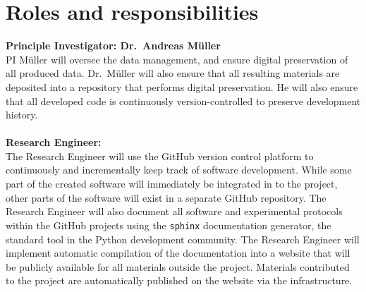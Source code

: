 











%

\section{Roles and responsibilities}

\textbf{Principle Investigator: Dr.\ Andreas M\"uller}\\
PI M\"uller will oversee the data management, and ensure digital preservation of
all produced data. Dr.\ M\"uller will also ensure that all resulting materials
are deposited into a repository that performs digital preservation.
He will also ensure that all developed code is continuously version-controlled to
preserve development history.
\\\\
\textbf{Research Engineer:}\\
The Research Engineer will use the GitHub version control platform to
continuously and incrementally keep track of software development. While some
part of the created software will immediately be integrated in to the
\sklearn{} project, other parts of the software will exist in a separate
GitHub repository. The Research Engineer will also document all software and
experimental protocols within the GitHub projects using the \texttt{sphinx}
documentation generator, the standard tool in the Python development community.
The Research Engineer will implement automatic compilation of the documentation
into a website that will be publicly available for all materials outside the \sklearn{}
project. Materials contributed to the \sklearn{} project are automatically
published on the \sklearn{} website via the \sklearn{} infrastructure.

